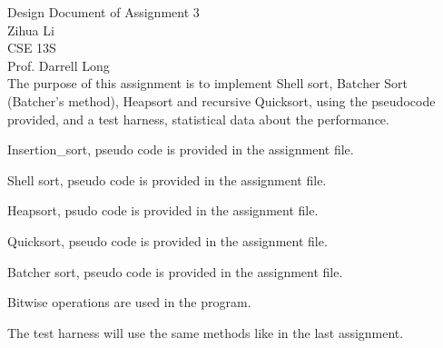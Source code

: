 \documentclass[final,letterpaper,12pt]{article}
\begin{document}
Design Document of Assignment 3\\
Zihua Li\\
CSE 13S\\
Prof. Darrell Long\\

The purpose of this assignment is to implement Shell sort, Batcher Sort (Batcher's method), Heapsort and recursive Quicksort, using the pseudocode provided, and a test harness, statistical data about the performance.

Insertion_sort, pseudo code is provided in the assignment file.

Shell sort, pseudo code is provided in the assignment file.

Heapsort, psudo code is provided in the assignment file.

Quicksort, pseudo code is provided in the assignment file.

Batcher sort, pseudo code is provided in the assignment file.

Bitwise operations are used in the program.

The test harness will use the same methods like in the last assignment.
\end{document}
